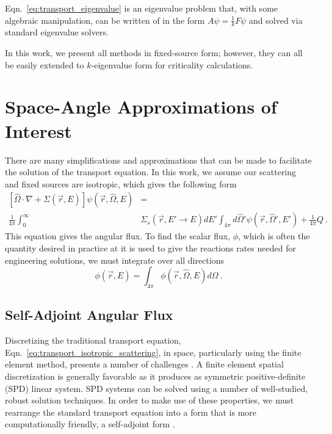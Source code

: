 Eqn.~\eqref{eq:transport_eigenvalue} is an eigenvalue problem that, with some algebraic manipulation, can be written of in the form $A\psi = \frac{1}{k} F\psi$ and solved via standard eigenvalue solvers. 

In this work, we present all methods in fixed-source form; however, they can all be easily extended to $k$-eigenvalue form for criticality calculations. 

\section{Space-Angle Approximations of Interest}
There are many simplifications and approximations that can be made to facilitate the solution of the transport equation. In this work, we assume our scattering and fixed sources are isotropic, which gives the following form
%
\begin{equation}
\begin{split}
 [\hat{\Omega} \cdot \nabla + \Sigma(\vec{r}, E)]\psi(\vec{r}, \hat{\Omega}, E) &= \\ \frac{1}{4\pi}  \int_0^\infty &\Sigma_s(\vec{r}, E' \rightarrow E)  dE' \int_{4\pi} d\hat{\Omega}'\psi(\vec{r}, \hat{\Omega}', E')  + \frac{1}{4\pi}Q \:.
\end{split}
 \label{eq:transport_isotropic_scattering}
\end{equation}
%
This equation gives the angular flux. To find the scalar flux, $\phi$, which is often the quantity desired in practice at it is used to give the reactions rates needed for engineering solutions, we must integrate over all directions
\begin{equation}
    \phi(\vec{r}, E) = \int_{4\pi} \phi(\vec{r}, \hat{\Omega}, E) d \Omega \:.
\end{equation}

\subsection{Self-Adjoint Angular Flux}
Discretizing the traditional transport equation, Eqn.~\eqref{eq:transport_isotropic_scattering}, in space, particularly using the finite element method, presents a number of challenges \cite{saaf}. A finite element spatial discretization is generally favorable as it produces as symmetric positive-definite (SPD) linear system. SPD systems can be solved using a number of well-studied, robust solution techniques. In order to make use of these properties, we must rearrange the standard transport equation into a form that is more computationally friendly, a self-adjoint form \cite{saaf}.

